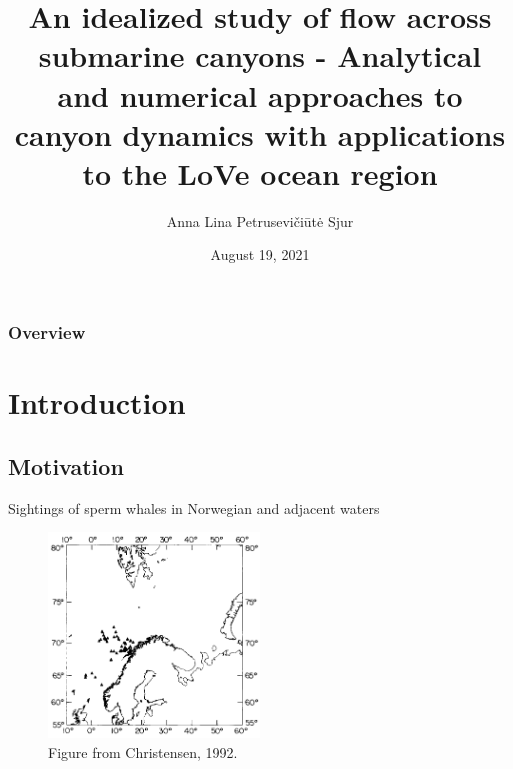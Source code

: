 \documentclass{beamer}
\title[An idealized study of flow across submarine canyons]{An idealized study of flow across submarine canyons - Analytical and numerical approaches to canyon dynamics with applications to the LoVe ocean region} %
\author{Anna Lina Petrusevi\v ci\=ut\.e Sjur} %
\institute[UiO] %
{
University of Oslo \\ %
\medskip
}
\date{August 19, 2021} %
\begin{document}
{
\begin{frame}
\titlepage %
\end{frame}
}

\begin{frame}
\frametitle{Overview} %
\tableofcontents %
\end{frame}


\section{Introduction} %

\subsection{Motivation} %
\begin{frame}{Sightings of sperm whales in Norwegian and adjacent waters}
    \begin{figure}
    \centering
    \includegraphics[width = 0.5\textwidth]{figures/whalesitings_large.pdf}
    \caption{Figure from Christensen, 1992.} %
\end{figure}
\end{frame}
\end{document}
